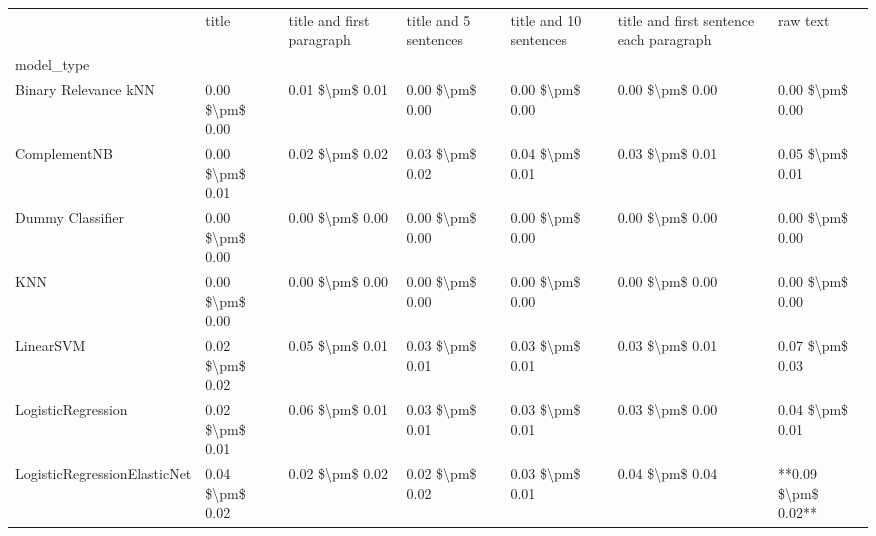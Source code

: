 \begin{tabular}{lllllll}
\toprule
{} &            title & title and first paragraph & title and 5 sentences & title and 10 sentences & title and first sentence each paragraph &             raw text \\
model\_type                      &                  &                           &                       &                        &                                         &                      \\
\midrule
Binary Relevance kNN            &  0.00 \$\textbackslash pm\$ 0.00 &           0.01 \$\textbackslash pm\$ 0.01 &       0.00 \$\textbackslash pm\$ 0.00 &        0.00 \$\textbackslash pm\$ 0.00 &                         0.00 \$\textbackslash pm\$ 0.00 &      0.00 \$\textbackslash pm\$ 0.00 \\
ComplementNB                    &  0.00 \$\textbackslash pm\$ 0.01 &           0.02 \$\textbackslash pm\$ 0.02 &       0.03 \$\textbackslash pm\$ 0.02 &        0.04 \$\textbackslash pm\$ 0.01 &                         0.03 \$\textbackslash pm\$ 0.01 &      0.05 \$\textbackslash pm\$ 0.01 \\
Dummy Classifier                &  0.00 \$\textbackslash pm\$ 0.00 &           0.00 \$\textbackslash pm\$ 0.00 &       0.00 \$\textbackslash pm\$ 0.00 &        0.00 \$\textbackslash pm\$ 0.00 &                         0.00 \$\textbackslash pm\$ 0.00 &      0.00 \$\textbackslash pm\$ 0.00 \\
KNN                             &  0.00 \$\textbackslash pm\$ 0.00 &           0.00 \$\textbackslash pm\$ 0.00 &       0.00 \$\textbackslash pm\$ 0.00 &        0.00 \$\textbackslash pm\$ 0.00 &                         0.00 \$\textbackslash pm\$ 0.00 &      0.00 \$\textbackslash pm\$ 0.00 \\
LinearSVM                       &  0.02 \$\textbackslash pm\$ 0.02 &           0.05 \$\textbackslash pm\$ 0.01 &       0.03 \$\textbackslash pm\$ 0.01 &        0.03 \$\textbackslash pm\$ 0.01 &                         0.03 \$\textbackslash pm\$ 0.01 &      0.07 \$\textbackslash pm\$ 0.03 \\
LogisticRegression              &  0.02 \$\textbackslash pm\$ 0.01 &           0.06 \$\textbackslash pm\$ 0.01 &       0.03 \$\textbackslash pm\$ 0.01 &        0.03 \$\textbackslash pm\$ 0.01 &                         0.03 \$\textbackslash pm\$ 0.00 &      0.04 \$\textbackslash pm\$ 0.01 \\
LogisticRegressionElasticNet    &  0.04 \$\textbackslash pm\$ 0.02 &           0.02 \$\textbackslash pm\$ 0.02 &       0.02 \$\textbackslash pm\$ 0.02 &        0.03 \$\textbackslash pm\$ 0.01 &                         0.04 \$\textbackslash pm\$ 0.04 &  **0.09 \$\textbackslash pm\$ 0.02** \\

\end{tabular}
